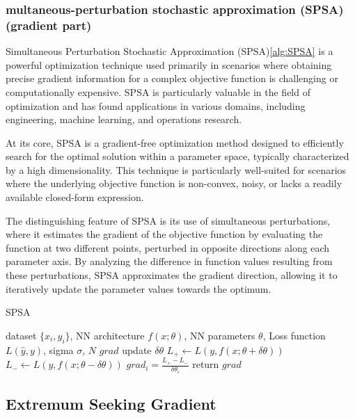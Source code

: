 \documentclass[nohyperref]{article}
\theoremstyle{plain}
\theoremstyle{definition}
\theoremstyle{remark}
\begin{document}
\subsubsection{multaneous-perturbation stochastic
approximation (SPSA) (gradient part)}
Simultaneous Perturbation Stochastic Approximation (SPSA)\cref{alg:SPSA} is a powerful optimization technique used primarily in scenarios where obtaining precise gradient information for a complex objective function is challenging or computationally expensive. SPSA is particularly valuable in the field of optimization and has found applications in various domains, including engineering, machine learning, and operations research.

At its core, SPSA is a gradient-free optimization method designed to efficiently search for the optimal solution within a parameter space, typically characterized by a high dimensionality. This technique is particularly well-suited for scenarios where the underlying objective function is non-convex, noisy, or lacks a readily available closed-form expression.

The distinguishing feature of SPSA is its use of simultaneous perturbations, where it estimates the gradient of the objective function by evaluating the function at two different points, perturbed in opposite directions along each parameter axis. By analyzing the difference in function values resulting from these perturbations, SPSA approximates the gradient direction, allowing it to iteratively update the parameter values towards the optimum.

\begin{algorithm}[tb]
   \caption{SPSA}
   \label{alg:SPSA}
\begin{algorithmic}
   dataset $\{x_{i},y_{i}\}$, NN architecture $f(x;\theta)$, NN parameters $\theta$, Loss function $L(\hat{y},y)$, sigma $\sigma$, $N$
   $grad$
  \STATE update $\delta \theta$
  \STATE $L_{+} \leftarrow L(y,f(x;\theta+\delta \theta))$
  \STATE $L_{-} \leftarrow L(y,f(x;\theta-\delta \theta))$
  \STATE $grad_{i} = \frac{L_{+}-L_{-}}{\delta\theta_{i}}$
  \STATE return $grad$

\end{algorithmic}
\end{algorithm}


\subsection{Extremum Seeking Gradient}
\end{document}
